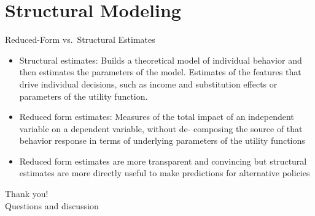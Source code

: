 \documentclass[11pt,aspectratio=169]{beamer}
\begin{document}
\section{Structural Modeling}

\begin{frame}{Reduced-Form vs.\ Structural Estimates}
	\begin{itemize}
		\item Structural estimates: Builds a theoretical model of individual behavior and then
		estimates the parameters of the model. Estimates of the features that drive individual
		decisions, such as income and substitution effects or parameters of the utility
		function.
		\item Reduced form estimates: Measures of the total impact of an independent variable on
		a dependent variable, without de- composing the source of that behavior response in
		terms of underlying parameters of the utility functions
		
		\item Reduced form estimates are more transparent and convincing but structural
		estimates are more directly useful to make predictions for alternative policies
	\end{itemize}

\end{frame}

 

\begin{frame}[standout]
  Thank you!\\
  \vspace{0.5em}
  \small Questions and discussion
\end{frame}
\end{document}
